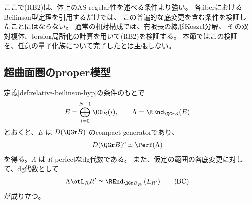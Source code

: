 ここで(RB2)は、体上のAS-regular性を述べる条件より強い。
各fiberにおけるBeilinson型定理を引用するだけでは、
この普遍的な底変更を含む条件を検証したことにはならない。
通常の相対構成では、有限長の線形Koszul分解、
その双対複体、torsion局所化の計算を用いて(RB2)を検証する。
本節ではこの検証を、任意の量子化族について完了したとは主張しない。

\subsection{超曲面圏のproper模型}

\begin{proposition}[相対proper模型]\label{prop:relative-proper-model}
 定義\ref{def:relative-beilinson-hyp}の条件のもとで
 \[
 E=\bigoplus_{i=0}^{N-1}\OO_B(i),\qquad
 \Lambda=\REnd_{\QGr B}(E)
 \]
 とおくと、\(E\) は \(D(\QGr B)\) のcompact generatorであり、
 \[
 D(\QGr B)^c\simeq\Perf(\Lambda)
 \]
 を得る。\(\Lambda\) は \(R\)-perfectなdg代数である。
 また、仮定の範囲の各底変更に対して、dg代数として
 \[
 \Lambda\otL_RR'\simeq
 \REnd_{\QGr B_{R'}}(E_{R'})
 \tag{BC}\label{eq:relative-proper-basechange}
 \]
 が成り立つ。
\end{proposition}

